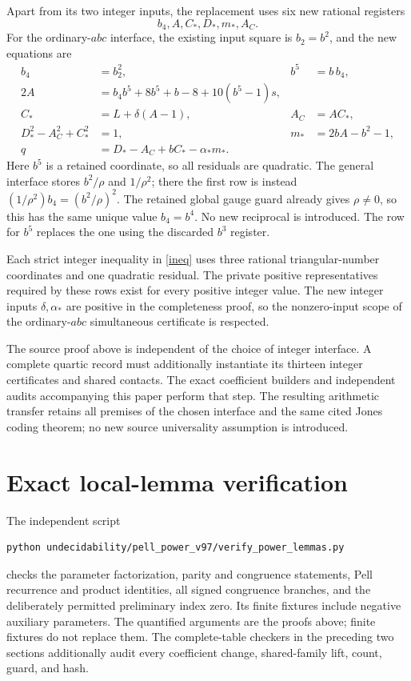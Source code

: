 \documentclass[11pt]{article}
\begin{document}
Apart from its two integer inputs, the replacement uses six new
rational registers
\[
                         b_4,A,C_*,D_*,m_*,A_C.
\]
For the ordinary-\(abc\) interface, the existing input square is
\(b_2=b^2\), and the new equations are
\begin{align*}
 b_4&=b_2^2,& b^5&=b\,b_4,\\
 2A&=b_4b^5+8b^5+b-8+10(b^5-1)s,&&\\
 C_*&=L+\delta(A-1),& A_C&=AC_*,\\
 D_*^2-A_C^2+C_*^2&=1,&m_*&=2bA-b^2-1,\\
 q&=D_*-A_C+bC_*-\alpha_*m_* .&&
\end{align*}
Here \(b^5\) is a retained coordinate, so all residuals are quadratic.
The general interface stores \(b^2/\rho\) and \(1/\rho^2\);
there the first row is instead
\((1/\rho^2)b_4=(b^2/\rho)^2\).
The retained global gauge guard already gives \(\rho\ne0\), so
this has the same unique value \(b_4=b^4\).
No new reciprocal is introduced. The row for \(b^5\) replaces
the one using the discarded \(b^3\) register.

Each strict integer inequality in \eqref{ineq} uses three rational
triangular-number coordinates and one quadratic residual. The private
positive representatives required by these rows exist for every
positive integer value. The new integer inputs \(\delta,\alpha_*\)
are positive in the completeness proof, so the nonzero-input scope
of the ordinary-\(abc\) simultaneous certificate is respected.

The source proof above is independent of the choice of integer
interface. A complete quartic record must additionally instantiate
its thirteen integer certificates and shared contacts. The exact
coefficient builders and independent audits accompanying this paper
perform that step. The resulting arithmetic transfer retains all
premises of the chosen interface and the same cited Jones coding
theorem; no new source universality assumption is introduced.




\section{Exact local-lemma verification}

The independent script
\begin{verbatim}
python undecidability/pell_power_v97/verify_power_lemmas.py
\end{verbatim}
checks the parameter factorization, parity and congruence statements,
Pell recurrence and product identities, all signed congruence
branches, and the deliberately permitted preliminary index zero.
Its finite fixtures include negative auxiliary parameters. The
quantified arguments are the proofs above; finite fixtures do not
replace them. The complete-table checkers in the preceding two
sections additionally audit every coefficient change, shared-family
lift, count, guard, and hash.
\end{document}
